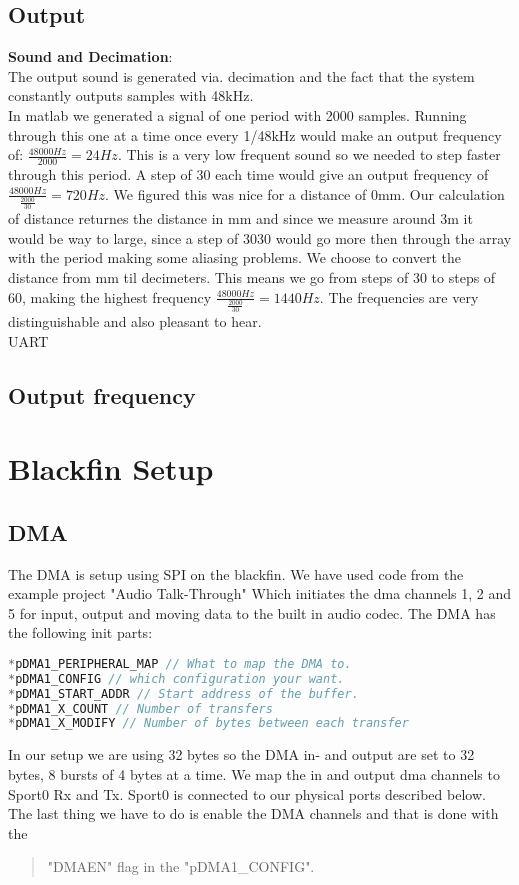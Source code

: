 \subsection{Output}
\textbf{Sound and Decimation}:\\
The output sound is generated via. decimation and the fact that the system constantly outputs samples with 48kHz.\\
In matlab we generated a signal of one period with 2000 samples. Running through this one at a time once every 1/48kHz would make an output frequency of: $\frac{48000Hz}{2000}=24Hz$. This is a very low frequent sound so we needed to step faster through this period. A step of 30 each time would give an output frequency of $\frac{48000Hz}{\frac{2000}{30}}=720Hz$. We figured this was nice for a distance of 0mm. Our calculation of distance returnes the distance in mm and since we measure around 3m it would be way to large, since a step of 3030 would go more then through the array with the period making some aliasing problems. We choose to convert the distance from mm til decimeters. This means we go from steps of 30 to steps of 60, making the highest frequency $\frac{48000Hz}{\frac{2000}{30}}=1440Hz$. The frequencies are very distinguishable and also pleasant to hear.\\
UART\\
\subsection{Output frequency}

\section{Blackfin Setup}
\subsection{DMA}
The DMA is setup using SPI on the blackfin. We have used code from the example project "Audio Talk-Through" Which initiates the dma channels 1, 2 and 5 for input, output and moving data to the built in audio codec. The DMA has the following init parts:
\begin{lstlisting}[language=C]
*pDMA1_PERIPHERAL_MAP // What to map the DMA to.
*pDMA1_CONFIG // which configuration your want.
*pDMA1_START_ADDR // Start address of the buffer.
*pDMA1_X_COUNT // Number of transfers
*pDMA1_X_MODIFY // Number of bytes between each transfer
\end{lstlisting}
In our setup we are using 32 bytes so the DMA in- and output are set to 32 bytes, 8 bursts of 4 bytes at a time. We map the in and output dma channels to Sport0 Rx and Tx. Sport0 is connected to our physical ports described below. The last thing we have to do is enable the DMA channels and that is done with the \begin{quote}
"DMAEN" flag in the "pDMA1\_CONFIG".
\end{quote}
